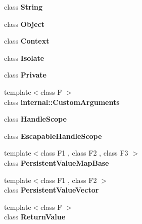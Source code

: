 \begin{DoxyCompactItemize}
class {\bfseries String}
\item 
\mbox{\label{classv8_1_1Local_a0720b5f434e636e22a3ed34f847eec57}} 
class {\bfseries Object}
\item 
\mbox{\label{classv8_1_1Local_ac26c806e60ca4a0547680edb68f6e39b}} 
class {\bfseries Context}
\item 
\mbox{\label{classv8_1_1Local_aba4f0964bdacf2bbf62cf876e5d28d0a}} 
class {\bfseries Isolate}
\item 
\mbox{\label{classv8_1_1Local_ac96b60d37bd806132da680e187dc2288}} 
class {\bfseries Private}
\item 
\mbox{\label{classv8_1_1Local_a07108678a2af25caab612879ed7dca62}} 
{\footnotesize template$<$class F $>$ }\\class {\bfseries internal\+::\+Custom\+Arguments}
\item 
\mbox{\label{classv8_1_1Local_a5f127e488db492b05c8542cec0b880b7}} 
class {\bfseries Handle\+Scope}
\item 
\mbox{\label{classv8_1_1Local_ade20a528f8ee42d426959f061cff29ff}} 
class {\bfseries Escapable\+Handle\+Scope}
\item 
\mbox{\label{classv8_1_1Local_a08e2b8f164392d71811ce6cc134f33e3}} 
{\footnotesize template$<$class F1 , class F2 , class F3 $>$ }\\class {\bfseries Persistent\+Value\+Map\+Base}
\item 
\mbox{\label{classv8_1_1Local_a978bb1377559897d74d5fe883a54a315}} 
{\footnotesize template$<$class F1 , class F2 $>$ }\\class {\bfseries Persistent\+Value\+Vector}
\item 
\mbox{\label{classv8_1_1Local_a53f604d3d6f2dc0647df33c9979f116a}} 
{\footnotesize template$<$class F $>$ }\\class {\bfseries Return\+Value}
\item 
\mbox{\label{classv8_1_1Local_a696a04c5f02bf0aeedd1e5a539587de4}} 

\end{DoxyCompactItemize}
